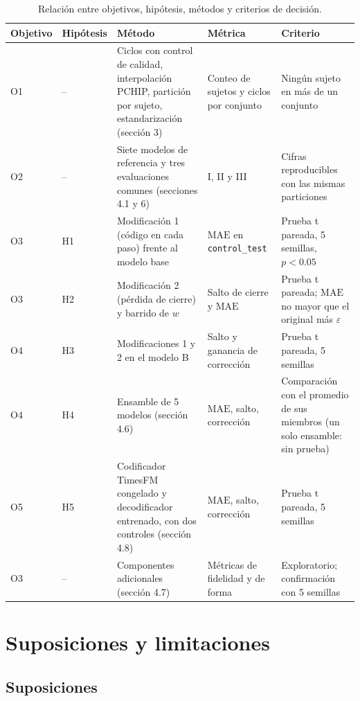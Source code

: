 \documentclass[11pt,a4paper]{article}
\newcommand{\Mae}{\mathrm{MAE}}
\begin{document}
\begin{table}[h]
\centering\footnotesize
\setlength{\tabcolsep}{4pt}
\begin{tabularx}{\textwidth}{@{}>{\raggedright\arraybackslash}p{1.1cm}>{\raggedright\arraybackslash}p{1.1cm}>{\raggedright\arraybackslash}X>{\raggedright\arraybackslash}p{3.0cm}>{\raggedright\arraybackslash}p{3.4cm}@{}}
\toprule
Objetivo & Hipótesis & Método & Métrica & Criterio \\
\midrule
O1 & -- & Ciclos con control de calidad, interpolación PCHIP, partición por sujeto, estandarización (sección 3) & Conteo de sujetos y ciclos por conjunto & Ningún sujeto en más de un conjunto \\
O2 & -- & Siete modelos de referencia y tres evaluaciones comunes (secciones 4.1 y 6) & I, II y III & Cifras reproducibles con las mismas particiones \\
O3 & H1 & Modificación 1 (código en cada paso) frente al modelo base & $\Mae$ en \texttt{control\_test} & Prueba t pareada, 5 semillas, $p<0.05$ \\
O3 & H2 & Modificación 2 (pérdida de cierre) y barrido de $w$ & Salto de cierre y $\Mae$ & Prueba t pareada; $\Mae$ no mayor que el original más $\varepsilon$ \\
O4 & H3 & Modificaciones 1 y 2 en el modelo B & Salto y ganancia de corrección & Prueba t pareada, 5 semillas \\
O4 & H4 & Ensamble de 5 modelos (sección 4.6) & $\Mae$, salto, corrección & Comparación con el promedio de sus miembros (un solo ensamble: sin prueba) \\
O5 & H5 & Codificador TimesFM congelado y decodificador entrenado, con dos controles (sección 4.8) & $\Mae$, salto, corrección & Prueba t pareada, 5 semillas \\
O3 & -- & Componentes adicionales (sección 4.7) & Métricas de fidelidad y de forma & Exploratorio; confirmación con 5 semillas \\
\bottomrule
\end{tabularx}
\caption{Relación entre objetivos, hipótesis, métodos y criterios de decisión.}
\end{table}

\section{Suposiciones y limitaciones}
\label{sec:limites}

\subsection{Suposiciones}
\end{document}
